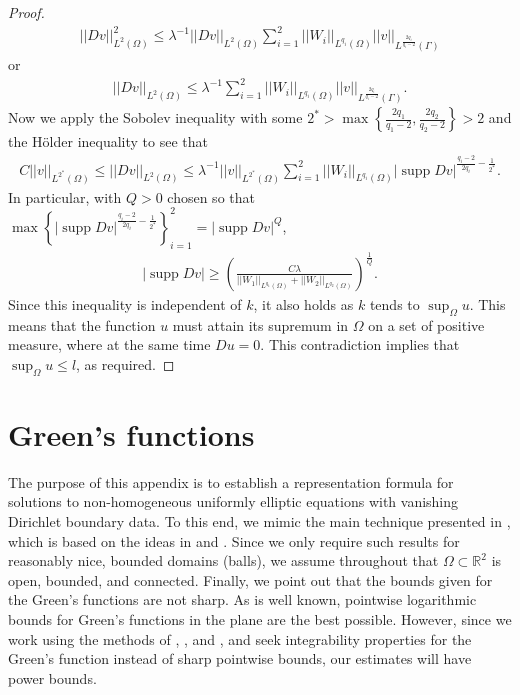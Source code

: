 \documentclass[12pt,reqno]{amsart}
\theoremstyle{plain}
\theoremstyle{definition}
\newcommand{\disp}{\displaystyle}
\DeclareMathOperator{\supp}{supp}
\newcommand{\Ga}{\Gamma}
\newcommand{\la}{\lambda}
\newcommand{\Om}{\Omega}
\newcommand{\su}{\subset}
\newcommand{\norm}[1]{\left\vert \left\vert #1\right\vert\right\vert}
\newcommand{\abs}[1]{\left\vert#1\right\vert}
\newcommand{\set}[1]{\left\{#1\right\}}
\newcommand{\pr}[1]{\left( #1 \right) }
\newcommand{\R}{\ensuremath{\mathbb{R}}}
\begin{document}
\begin{appendix}
\begin{proof}
\begin{align*}
\norm{Dv}_{L^2\pr{\Om}}^2
\le \la^{-1} \norm{Dv}_{L^2\pr{\Om}} \sum_{i = 1}^2 \norm{W_i}_{L^{q_i}\pr{\Om}} \norm{v}_{L^{\frac{2q_i}{q_i-2}}\pr{\Ga}}
\end{align*}
or
\begin{align*}
\norm{Dv}_{L^2\pr{\Om}}
\le  \la^{-1} \sum_{i = 1}^2 \norm{W_i}_{L^{q_i}\pr{\Om}} \norm{v}_{L^{\frac{2q_i}{q_i-2}}\pr{\Ga}}.
\end{align*}
Now we apply the Sobolev inequality with some $2^* >\max\set{ \frac{2q_1}{q_1-2},  \frac{2q_2}{q_2-2}} > 2$ and the H\"older inequality to see that
\begin{align*}
C\norm{v}_{L^{2^*}\pr{\Om}} \le  \norm{Dv}_{L^2\pr{\Om}}
\le \la^{-1}  \norm{v}_{L^{2^*}\pr{\Om}} \sum_{i = 1}^2 \norm{W_i}_{L^{q_i}\pr{\Om}} \abs{\supp Dv}^{\frac{q_i-2}{2q_i} - \frac 1 {2^*}}.
\end{align*}
In particular, with $Q > 0$ chosen so that $\max\set{\abs{\supp Dv}^{\frac{q_i-2}{2q_i} - \frac 1 {2^*}}}_{i=1}^2 = \abs{\supp Dv}^Q$,
\begin{align*}
\abs{\supp Dv}
\ge \pr{ \frac{C\la}{ \norm{W_1}_{L^{q_1}\pr{\Om}} + \norm{W_2}_{L^{q_2}\pr{\Om}}} }^{\frac{1}{Q}}.
\end{align*}
Since this inequality is independent of $k$, it also holds as $k$ tends to $\disp \sup_{\Om} u$.
This means that the function $u$ must attain its supremum in $\Om$ on a set of positive measure, where at the same time $D u = 0$.
This contradiction implies that $\disp \sup_{\Om} u \le l$, as required.
\end{proof}

\section{Green's functions}
\label{AppB}

The purpose of this appendix is to establish a representation formula for solutions to non-homogeneous uniformly elliptic equations with vanishing Dirichlet boundary data.
To this end, we mimic the main technique presented in \cite{DHM16}, which is based on the ideas in \cite{HK07} and \cite{GW82}.
Since we only require such results for reasonably nice, bounded domains (balls), we assume throughout that $\Om \su \R^2$ is open, bounded, and connected.
Finally, we point out that the bounds given for the Green's functions are not sharp.
As is well known, pointwise logarithmic bounds for Green's functions in the plane are the best possible.
However, since we work using the methods of \cite{GW82}, \cite{HK07}, and \cite{DHM16}, and seek integrability properties for the Green's function instead of sharp pointwise bounds, our estimates will have power bounds.


\end{appendix}
\end{document}
